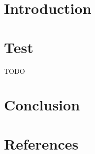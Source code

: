 \maketitle



\tableofcontents



\section*{Introduction}\label{sec:intro}





\section{Test}\label{sec:test}

TODO



\section*{Conclusion}\label{sec:ccl}
 




\section*{References}\label{sec:refs}





%




